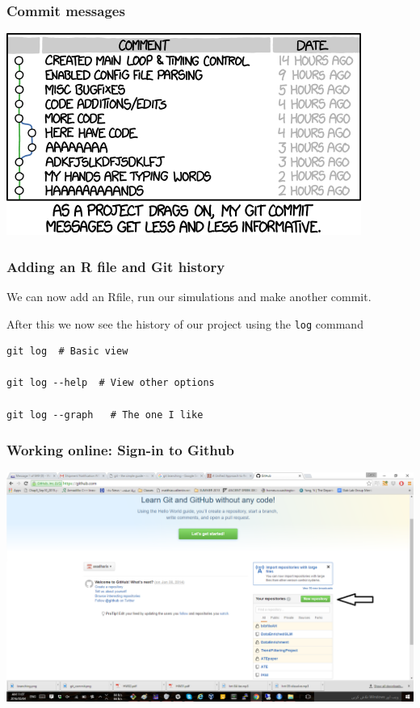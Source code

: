 \documentclass{beamer}
\begin{document}
\begin{frame}
\frametitle{Commit messages }
\centering
\includegraphics[scale = 0.6]{git_commit}
\end{frame}

\begin{frame}[fragile]
\frametitle{Adding an R file and Git history}
We can now add an Rfile, run our simulations and make another commit.


After this we now see the history of our project using the \texttt{log} command

\begin{verbatim}
git log  # Basic view

git log --help  # View other options

git log --graph   # The one I like
\end{verbatim}
\end{frame}

\begin{frame}
\frametitle{Working online: Sign-in to Github}
\includegraphics[scale = 0.3]{signin}
\end{frame}
\end{document}
